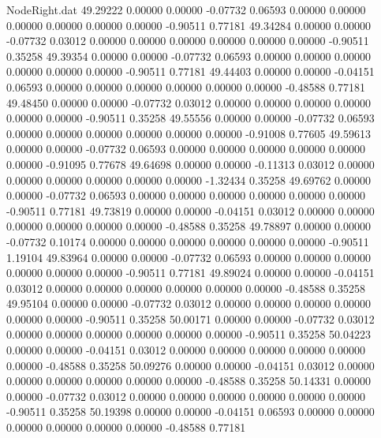 \begin{filecontents}{NodeRight.dat}
  49.29222    0.00000    0.00000    -0.07732    0.06593    0.00000    0.00000    0.00000    0.00000    0.00000    0.00000   -0.90511    0.77181
  49.34284    0.00000    0.00000    -0.07732    0.03012    0.00000    0.00000    0.00000    0.00000    0.00000    0.00000   -0.90511    0.35258
  49.39354    0.00000    0.00000    -0.07732    0.06593    0.00000    0.00000    0.00000    0.00000    0.00000    0.00000   -0.90511    0.77181
  49.44403    0.00000    0.00000    -0.04151    0.06593    0.00000    0.00000    0.00000    0.00000    0.00000    0.00000   -0.48588    0.77181
  49.48450    0.00000    0.00000    -0.07732    0.03012    0.00000    0.00000    0.00000    0.00000    0.00000    0.00000   -0.90511    0.35258
  49.55556    0.00000    0.00000    -0.07732    0.06593    0.00000    0.00000    0.00000    0.00000    0.00000    0.00000   -0.91008    0.77605
  49.59613    0.00000    0.00000    -0.07732    0.06593    0.00000    0.00000    0.00000    0.00000    0.00000    0.00000   -0.91095    0.77678
  49.64698    0.00000    0.00000    -0.11313    0.03012    0.00000    0.00000    0.00000    0.00000    0.00000    0.00000   -1.32434    0.35258
  49.69762    0.00000    0.00000    -0.07732    0.06593    0.00000    0.00000    0.00000    0.00000    0.00000    0.00000   -0.90511    0.77181
  49.73819    0.00000    0.00000    -0.04151    0.03012    0.00000    0.00000    0.00000    0.00000    0.00000    0.00000   -0.48588    0.35258
  49.78897    0.00000    0.00000    -0.07732    0.10174    0.00000    0.00000    0.00000    0.00000    0.00000    0.00000   -0.90511    1.19104
  49.83964    0.00000    0.00000    -0.07732    0.06593    0.00000    0.00000    0.00000    0.00000    0.00000    0.00000   -0.90511    0.77181
  49.89024    0.00000    0.00000    -0.04151    0.03012    0.00000    0.00000    0.00000    0.00000    0.00000    0.00000   -0.48588    0.35258
  49.95104    0.00000    0.00000    -0.07732    0.03012    0.00000    0.00000    0.00000    0.00000    0.00000    0.00000   -0.90511    0.35258
  50.00171    0.00000    0.00000    -0.07732    0.03012    0.00000    0.00000    0.00000    0.00000    0.00000    0.00000   -0.90511    0.35258
  50.04223    0.00000    0.00000    -0.04151    0.03012    0.00000    0.00000    0.00000    0.00000    0.00000    0.00000   -0.48588    0.35258
  50.09276    0.00000    0.00000    -0.04151    0.03012    0.00000    0.00000    0.00000    0.00000    0.00000    0.00000   -0.48588    0.35258
  50.14331    0.00000    0.00000    -0.07732    0.03012    0.00000    0.00000    0.00000    0.00000    0.00000    0.00000   -0.90511    0.35258
  50.19398    0.00000    0.00000    -0.04151    0.06593    0.00000    0.00000    0.00000    0.00000    0.00000    0.00000   -0.48588    0.77181

\end{filecontents}
